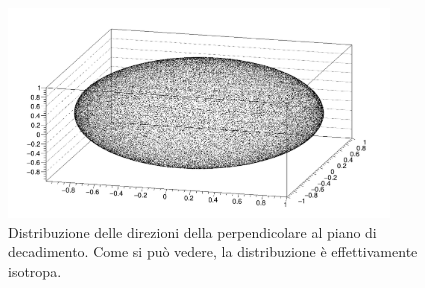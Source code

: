 \begin{figure}[h]\centering\includegraphics[width=0.9\textwidth]{../../img/isotrophy.png}\caption{Distribuzione delle direzioni della perpendicolare al piano di decadimento. Come si può vedere, la distribuzione è effettivamente isotropa.}\label{fig:isotrophy}\end{figure}
